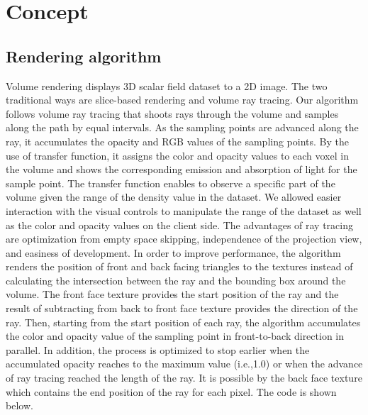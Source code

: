 \documentclass[annual]{acmsiggraph}
\begin{document}
\section{Concept}


\subsection{Rendering algorithm}

Volume rendering displays 3D scalar field dataset to a 2D image. The two traditional ways are slice-based rendering and volume ray tracing. Our algorithm follows volume ray tracing that shoots rays through the volume and samples along the path by equal intervals. As the sampling points are advanced along the ray, it accumulates the opacity and RGB values of the sampling points. By the use of transfer function, it assigns the color and opacity values to each voxel in the volume and shows the corresponding emission and absorption of light for the sample point. The transfer function enables to observe a specific part of the volume given the range of the density value in the dataset. We allowed easier interaction with the visual controls to manipulate the range of the dataset as well as the color and opacity values on the client side. 
The advantages of ray tracing are optimization from empty space skipping, independence of the projection view, and easiness of development. In order to improve performance, the algorithm renders the position of front and back facing triangles to the textures instead of calculating the intersection between the ray and the bounding box around the volume. The front face texture provides the start position of the ray and the result of subtracting from back to front face texture provides the direction of the ray. Then, starting from the start position of each ray, the algorithm accumulates the color and opacity value of the sampling point in front-to-back direction in parallel. In addition, the process is optimized to stop earlier when the accumulated opacity reaches to the maximum value (i.e.,1.0) or when the advance of ray tracing reached the length of the ray. It is possible by the back face texture which contains the end position of the ray for each pixel. The code is shown below.
\end{document}
